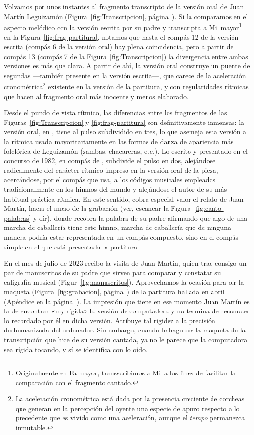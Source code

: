 Volvamos por unos instantes al fragmento transcripto de la versión oral de Juan Martín Leguizamón (Figura~\ref{fig:Transcripcion}, página~\pageref{fig:Transcripcion}). Si la comparamos en el aspecto melódico con la versión escrita por su padre y transcripta a Mi\bemoltxt\ mayor\footnote{Originalmente en Fa mayor, transscribimos a Mi\bemoltxt\ a los fines de facilitar la comparación con el fragmento cantado.} en la Figura~\ref{fig:frag-partitura}, notamos que hasta el compás 12 de la versión escrita (compás 6 de la versión oral) hay plena coincidencia, pero a partir de compás 13 (compás 7 de la Figura~\ref{fig:Transcripcion}) la divergencia entre ambas versiones es más que clara. A partir de ahí, la versión oral construye un puente de segundas  ---también presente en la versión escrita---, que carece de la aceleración cronométrica\footnote{La aceleración cronométrica está dada por la presencia creciente de corcheas que generan en la percepción del oyente una especie de apuro respecto a lo precedente que es vivido como una aceleración, aunque el \emph{tempo} permanezca inmutable.} existente en la versión de la partitura, y con regularidades rítmicas que hacen al fragmento oral más inocente y menos elaborado.

Desde el pundo de vista rítmico, las diferencias entre los fragmentos de las Figuras~\ref{fig:Transcripcion} y \ref{fig:frag-partitura} son definitivamente inmensas: la versión oral, en , tiene al pulso subdividido en tres, lo que asemeja esta versión a la rítmica usada mayoritariamente en las formas de danza de apariencia más folclórica de Leguizamón (zambas, chacareras, etc.). Lo escrito y presentado en el concurso de 1982, en compás de , subdivide el pulso en dos, alejándose radicalmente del carácter rítmico impreso en la versión oral de la pieza, acercándose, por el compás que usa, a los códigos musicales empleados tradicionalmente en los himnos del mundo y alejándose el autor de su más habitual práctica rítmica. En este sentido, cobra especial valor el relato de Juan Martín, hacia el inicio de la grabación (ver, escanear la Figura~\ref{fig:canto-palabras} y oír), donde recobra la palabra de su padre afirmando que algo de una marcha de caballería tiene este himno, marcha de caballería que de ninguna manera podría estar representada en un compás compuesto, sino en el compás simple en el que está presentada la partitura.

En el mes de julio de 2023 recibo la visita de Juan Martín, quien trae consigo un par de manuscritos de su padre que sirven para comparar y constatar su caligrafía musical (Figur~\ref{fig:manuscritos}). Aprovechamos la ocasión para oír la maqueta (Figura~\ref{fig:grabacion}, página~\pageref{fig:grabacion}) de la partitura hallada en abril (Apéndice en la página~\pageref{apx:partitura}). La impresión que tiene en ese momento Juan Martín es la de encontrar «my rígida» la versión de computadora y no termina de reconocer lo recordado por él en dicha versión. Atribuye tal rigidez a la precisión deshumanizada del ordenador. Sin embargo, cuando le hago oír la maqueta de la transcripción que hice de su versión cantada, ya no le parece que la computadora sea rígida tocando, y sí se identifica con lo oído.

